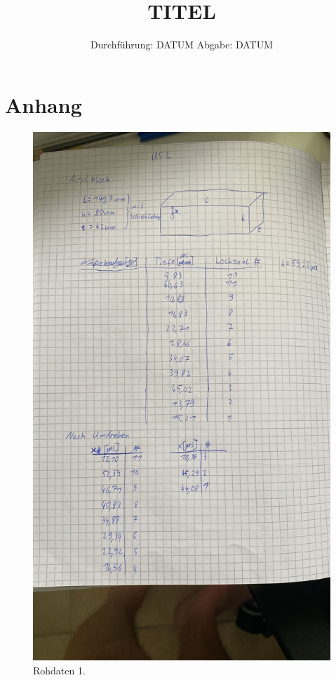 

\subject{VUS2}
\title{TITEL}
\date{%
  Durchführung: DATUM
  \hspace{3em}
  Abgabe: DATUM
}



\maketitle
\thispagestyle{empty}
\tableofcontents
\newpage






\printbibliography{}

\section{Anhang}
\begin{figure}[H]
  \includegraphics[width=\textwidth]{Bilder/messdaten1.jpg}
  \caption{Rohdaten 1.}
  \label{fig:1}
\end{figure}

